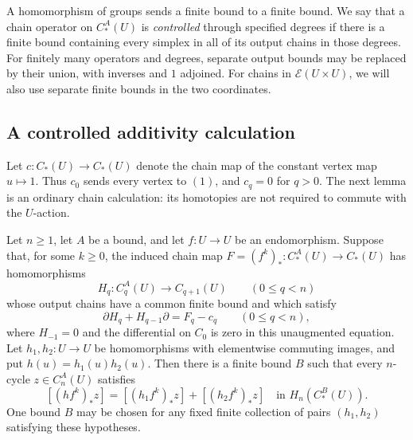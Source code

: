 A homomorphism of groups sends a finite bound to a finite bound.
We say that a chain operator on $C_*^A(U)$ is \emph{controlled} through
specified degrees if there is a finite bound containing every simplex
in all of its output chains in those degrees.  For finitely many
operators and degrees, separate output bounds may be replaced by
their union, with inverses and $1$ adjoined.  For chains in
$\mathcal E(U\times U)$, we will also use separate finite bounds in
the two coordinates.

\subsection{A controlled additivity calculation}

Let $c:C_*(U)\to C_*(U)$ denote the chain map of the constant vertex
map $u\mapsto1$.  Thus $c_0$ sends every vertex to $(1)$, and $c_q=0$
for $q>0$.  The next lemma is an ordinary chain calculation: its
homotopies are not required to commute with the $U$-action.

\begin{lemma}\label{lem:controlled-additivity}
Let $n\ge1$, let $A$ be a bound, and let $f:U\to U$ be an
endomorphism.  Suppose that, for some $k\ge0$, the induced chain map
$F=(f^k)_*:C_*^A(U)\to C_*(U)$ has homomorphisms
\[
 H_q:C_q^A(U)\longrightarrow C_{q+1}(U)
       \qquad(0\le q<n)
\]
whose output chains have a common finite bound and which satisfy
\[
 \partial H_q+H_{q-1}\partial=F_q-c_q
       \qquad(0\le q<n),
\]
where $H_{-1}=0$ and the differential on $C_0$ is zero in this
unaugmented equation.  Let $h_1,h_2:U\to U$ be homomorphisms with
elementwise commuting images, and put $h(u)=h_1(u)h_2(u)$.
Then there is a finite bound $B$ such that every $n$-cycle
$z\in C_n^A(U)$ satisfies
\begin{equation}\label{eq:controlled-additivity}
 [(hf^k)_*z]=[(h_1f^k)_*z]+[(h_2f^k)_*z]
       \quad\text{in }H_n(C_*^B(U)).
\end{equation}
One bound $B$ may be chosen for any fixed finite collection of pairs
$(h_1,h_2)$ satisfying these hypotheses.
\end{lemma}


